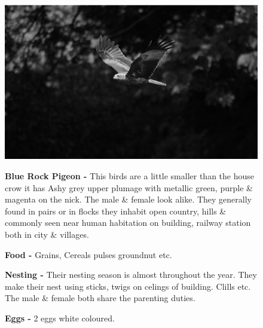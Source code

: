 \begin{figure}[H]
\begin{center}
\includegraphics{figure/Land_birds/01_pariah_kite/pariah-kite.eps}
\end{center}
\medskip
\noindent
{\bf Blue Rock Pigeon -} This birds are a little smaller than the house crow it has Ashy grey upper plumage with metallic green, purple \& magenta on the nick. The male \& female look alike. They generally found in pairs or in flocks they inhabit open country, hills \& commonly seen near human habitation on building, railway station both in city \& villages.

\medskip
{\bf Food -} Grains, Cereals pulses groundnut etc.

{\bf Nesting -} Their nesting season is almost throughout the year. They make their nest using sticks, twigs on celings of building. Clills etc. The male \& female both share the parenting duties.

{\bf Eggs -} 2 eggs white coloured.
\end{figure}

\vfill\eject

~\phantom{a}
\vfill

